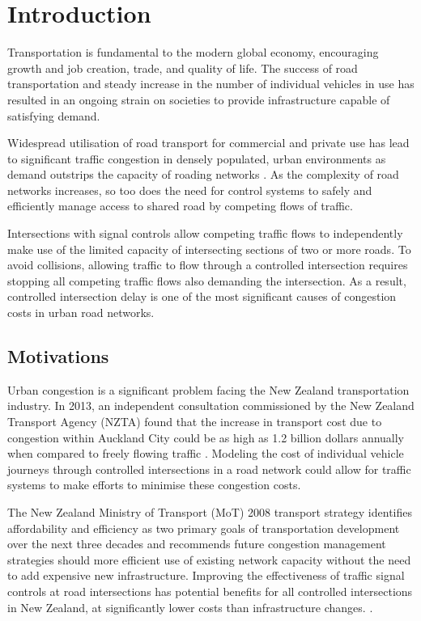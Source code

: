 \chapter{Introduction}

Transportation is fundamental to the modern global economy, encouraging growth and job creation, trade, and quality of life. The success of road transportation and steady increase in the number of individual vehicles in use has resulted in an ongoing strain on societies to provide infrastructure capable of satisfying demand. 

Widespread utilisation of road transport for commercial and private use has lead to significant traffic congestion in densely populated, urban environments as demand outstrips the capacity of roading networks \cite{euro2011whitepaper}. As the complexity of road networks increases, so too does the need for control systems to safely and efficiently manage access to shared road by competing flows of traffic. 

Intersections with signal controls allow competing traffic flows to independently make use of the limited capacity of intersecting sections of  two or more roads. To avoid collisions, allowing traffic to flow through a controlled intersection requires stopping all competing traffic flows also demanding the intersection. As a result, controlled intersection delay is one of the most significant causes of congestion costs in urban road networks.

\section {Motivations}

Urban congestion is a significant problem facing the New Zealand transportation industry. In 2013, an independent consultation commissioned by the New Zealand Transport Agency (NZTA) found that the increase in transport cost due to congestion within Auckland City could be as high as 1.2 billion dollars annually when compared to freely flowing traffic \cite{wallis2013costs}. Modeling the cost of individual vehicle journeys through controlled intersections in a road network could allow for traffic systems to make efforts to minimise these congestion costs.

The New Zealand Ministry of Transport (MoT) 2008 transport strategy identifies affordability and efficiency as two primary goals of transportation development over the next three decades and recommends future congestion management strategies should more efficient use of existing network capacity without the need to add expensive new infrastructure. Improving the effectiveness of traffic signal controls at road intersections has potential benefits for all controlled intersections in New Zealand, at significantly lower costs than infrastructure changes. \cite{mot2008strategy}.

